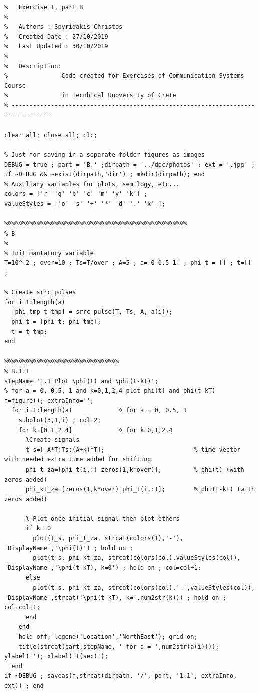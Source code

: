 \documentclass[11pt]{article}
\begin{document}
%
%
%
\begin{lstlisting}[caption = {\texttt{part\_b.m}}]
% ---------------------------------------------------------------------------------
%   Exercise 1, part B
%
%   Authors : Spyridakis Christos
%   Created Date : 27/10/2019
%   Last Updated : 30/10/2019
%
%   Description: 
%               Code created for Exercises of Communication Systems Course
%               in Tecnhical Unoversity of Crete
% ---------------------------------------------------------------------------------

clear all; close all; clc;

% Just for saving in a separate folder figures as images
DEBUG = true ; part = 'B.' ;dirpath = '../doc/photos' ; ext = '.jpg' ; if ~DEBUG && ~exist(dirpath,'dir') ; mkdir(dirpath); end
% Auxiliary variables for plots, semilogy, etc...
colors = ['r' 'g' 'b' 'c' 'm' 'y' 'k'] ;
valueStyles = ['o' 's' '+' '*' 'd' '.' 'x' ];

%%%%%%%%%%%%%%%%%%%%%%%%%%%%%%%%%%%%%%%%%%%%%%%%%%%
% B
%
% Init mantatory variable 
T=10^-2 ; over=10 ; Ts=T/over ; A=5 ; a=[0 0.5 1] ; phi_t = [] ; t=[] ; 

% Create srrc pulses 
for i=1:length(a)
  [phi_tmp t_tmp] = srrc_pulse(T, Ts, A, a(i));
  phi_t = [phi_t; phi_tmp];
  t = t_tmp;
end

%%%%%%%%%%%%%%%%%%%%%%%%%%%%%%%%
% B.1.1
stepName='1.1 Plot \phi(t) and \phi(t-kT)'; 
% for a = 0, 0.5, 1 and k=0,1,2,4 plot phi(t) and phi(t-kT)
f=figure(); extraInfo='';
  for i=1:length(a)             % for a = 0, 0.5, 1
    subplot(3,1,i) ; col=2;
    for k=[0 1 2 4]             % for k=0,1,2,4
      %Create signals
      t_s=[-A*T:Ts:(A+k)*T];                         % time vector with needed extra time added for shifting
      phi_t_za=[phi_t(i,:) zeros(1,k*over)];         % phi(t) (with zeros added)
      phi_kt_za=[zeros(1,k*over) phi_t(i,:)];        % phi(t-kT) (with zeros added)
      
      % Plot once initial signal then plot others
      if k==0 
        plot(t_s, phi_t_za, strcat(colors(1),'-'), 'DisplayName','\phi(t)') ; hold on ; 
        plot(t_s, phi_kt_za, strcat(colors(col),valueStyles(col)), 'DisplayName','\phi(t-kT), k=0') ; hold on ; col=col+1; 
      else
        plot(t_s, phi_kt_za, strcat(colors(col),'-',valueStyles(col)), 'DisplayName',strcat('\phi(t-kT), k=',num2str(k))) ; hold on ; col=col+1; 
      end
    end
    hold off; legend('Location','NorthEast'); grid on;
    title(strcat(part,stepName, ' for a = ',num2str(a(i)))); ylabel(''); xlabel('T(sec)'); 
  end
if ~DEBUG ; saveas(f,strcat(dirpath, '/', part, '1.1', extraInfo, ext)) ; end


\end{lstlisting}
\end{document}
